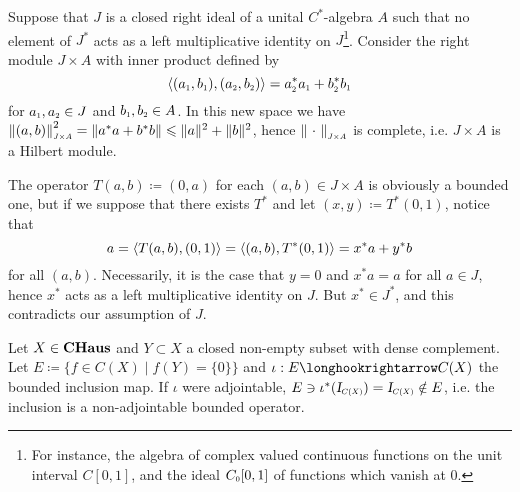\begin{contraexemplo}\label{contraexemplo: paschke non adjointable}
    Suppose that $J$ is a closed right ideal of a unital $C^{*}$-algebra $A$ such that no element of $J^{*}$ acts as a left multiplicative identity on $J$\footnote{For instance, the algebra of complex valued continuous functions on the unit interval $C[0,1]$, and the ideal $\sub C0[0,1]$ of functions which vanish at 0.}. Consider the right module $J \times A$ with inner product defined by 
    \begin{equation*}
    \inner{\left(\sub a{1}, \sub b{1}\right)}{\left(\sub a{2}, \sub b{2}\right)} = \sub a{2}^{*} \sub a{1}+\sub b{2}^{*} \sub b{1}
    \end{equation*}
    for $\sub a1, \sub a2 \in J$ and $\sub b1, \sub b2 \in A$. In this new space we have $\sub{\|(a, b)\|}{J\times A}^2=\left\|a^{*} a+b^* b\right\|\leq \|a\|^{2}+\|b\|^{2}$, hence $\sub{\|\come\|}{J\times A}$ is complete, i.e. $J\times A$ is a Hilbert module. 
    
    The operator $T(a,b)\coloneqq (0,a)$ for each $(a,b) \in J\times A$ is obviously a bounded one, but if we suppose that there exists $T^*$ and let $(x,y) \coloneqq T^*(0,1)$, notice that
    \begin{equation*}
        a = \langle {T(a,b)},{(0,1)}\rangle = \langle {(a,b)},{T^*(0,1)}\rangle = x^*a+y^*b
    \end{equation*}
    for all $(a,b)$. Necessarily, it is the case that $y=0$ and $x^*a=a$ for all $a\in J$, hence $x^*$ acts as a left multiplicative identity on $J$. But $x^* \in J^*$, and this contradicts our assumption of $J$.
\end{contraexemplo}
    
\begin{contraexemplo}
    Let $X\in \boldsymbol{\operatorname{CHaus}}$ and $Y \subset X$ a closed non-empty subset with dense complement. Let $E \coloneqq \big\{f \in C(X) \mid f(Y) = \{0\}\big\}$ and $\iota : E \longhookrightarrow C(X)$ the bounded inclusion map. If $\iota$ were adjointable, $E \ni \iota^*(\sub\Id{C(X)}) = \sub\Id{C(X)} \notin E$, i.e. the inclusion is a non-adjointable bounded operator.
\end{contraexemplo}
        
